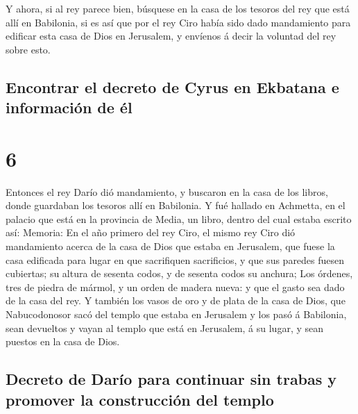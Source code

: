  Y ahora, si al rey parece bien, búsquese en la casa de
los tesoros del rey que está allí en Babilonia, si es así que por el rey
Ciro había sido dado mandamiento para edificar esta casa de Dios en
Jerusalem, y envíenos á decir la voluntad del rey sobre esto.

\hypertarget{encontrar-el-decreto-de-cyrus-en-ekbatana-e-informaciuxf3n-de-uxe9l}{%
\subsection{Encontrar el decreto de Cyrus en Ekbatana e información de
él}\label{encontrar-el-decreto-de-cyrus-en-ekbatana-e-informaciuxf3n-de-uxe9l}}

\hypertarget{section-15-6}{%
\section{6}\label{section-15-6}}

 Entonces el rey Darío dió mandamiento, y buscaron en la
casa de los libros, donde guardaban los tesoros allí en Babilonia.
 Y fué hallado en Achmetta, en el palacio que está en la
provincia de Media, un libro, dentro del cual estaba escrito así:
Memoria:  En el año primero del rey Ciro, el mismo rey
Ciro dió mandamiento acerca de la casa de Dios que estaba en Jerusalem,
que fuese la casa edificada para lugar en que sacrifiquen sacrificios, y
que sus paredes fuesen cubiertas; su altura de sesenta codos, y de
sesenta codos su anchura;  Los órdenes, tres de piedra de
mármol, y un orden de madera nueva: y que el gasto sea dado de la casa
del rey.  Y también los vasos de oro y de plata de la casa
de Dios, que Nabucodonosor sacó del templo que estaba en Jerusalem y los
pasó á Babilonia, sean devueltos y vayan al templo que está en
Jerusalem, á su lugar, y sean puestos en la casa de Dios.

\hypertarget{decreto-de-daruxedo-para-continuar-sin-trabas-y-promover-la-construcciuxf3n-del-templo}{%
\subsection{Decreto de Darío para continuar sin trabas y promover la
construcción del
templo}\label{decreto-de-daruxedo-para-continuar-sin-trabas-y-promover-la-construcciuxf3n-del-templo}}

